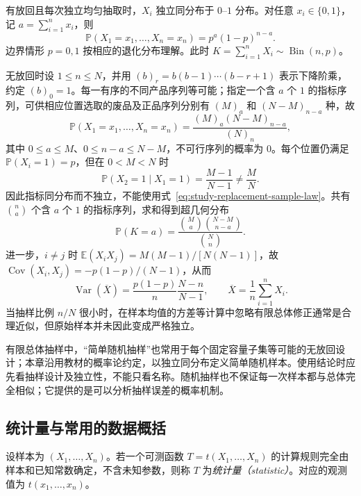 \begin{solve}
有放回且每次独立均匀抽取时，$X_i$ 独立同分布于 $0$--$1$ 分布。对任意 $x_i\in\{0,1\}$，记 $a=\sum_{i=1}^{n}x_i$，则
\begin{equation}
  \mathbb P(X_1=x_1,\ldots,X_n=x_n)=p^a(1-p)^{n-a}.
  \label{eq:study-replacement-sample-law}
\end{equation}
边界情形 $p=0,1$ 按相应的退化分布理解。此时 $K=\sum_{i=1}^{n}X_i\sim\operatorname{Bin}(n,p)$。

无放回时设 $1\le n\le N$，并用 $(b)_r=b(b-1)\cdots(b-r+1)$ 表示下降阶乘，约定 $(b)_0=1$。每一有序的不同产品序列等可能；指定一个含 $a$ 个 $1$ 的指标序列，可供相应位置选取的废品及正品序列分别有 $(M)_a$ 和 $(N-M)_{n-a}$ 种，故
\begin{equation}
  \mathbb P(X_1=x_1,\ldots,X_n=x_n)
  =\frac{(M)_a(N-M)_{n-a}}{(N)_n},
  \label{eq:study-without-replacement-law}
\end{equation}
其中 $0\le a\le M$、$0\le n-a\le N-M$，不可行序列的概率为 $0$。每个位置仍满足 $\mathbb P(X_i=1)=p$，但在 $0<M<N$ 时
\[
  \mathbb P(X_2=1\mid X_1=1)=\frac{M-1}{N-1}\ne\frac MN.
\]
因此指标同分布而不独立，不能使用式~\eqref{eq:study-replacement-sample-law}。共有 $\binom na$ 个含 $a$ 个 $1$ 的指标序列，求和得到超几何分布
\[
  \mathbb P(K=a)=\frac{\binom Ma\binom{N-M}{n-a}}{\binom Nn}.
\]
进一步，$i\ne j$ 时 $\mathbb E(X_iX_j)=M(M-1)/[N(N-1)]$，故 $\operatorname{Cov}(X_i,X_j)=-p(1-p)/(N-1)$，从而
\begin{equation}
  \operatorname{Var}(\overline X)
  =\frac{p(1-p)}n\frac{N-n}{N-1},
  \qquad \overline X=\frac1n\sum_{i=1}^{n}X_i.
  \label{eq:study-finite-population-variance}
\end{equation}
当抽样比例 $n/N$ 很小时，在样本均值的方差等计算中忽略有限总体修正通常是合理近似，但原始样本并未因此变成严格独立。
\end{solve}

有限总体抽样中，“简单随机抽样”也常用于每个固定容量子集等可能的无放回设计；本章沿用教材的概率论约定，以独立同分布定义简单随机样本。使用结论时应先看抽样设计及独立性，不能只看名称。随机抽样也不保证每一次样本都与总体完全相似；它提供的是可以分析抽样误差的概率机制。

\subsection{统计量与常用的数据概括}

\begin{definition}[统计量]
\label{def:study-statistic}
设样本为 $(X_1,\ldots,X_n)$。若一个可测函数 $T=t(X_1,\ldots,X_n)$ 的计算规则完全由样本和已知常数确定，不含未知参数，则称 $T$ 为\emph{统计量（statistic）}。对应的观测值为 $t(x_1,\ldots,x_n)$。
\end{definition}

